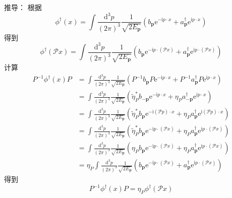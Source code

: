 推导：
根据
\begin{equation}
    \phi ^{\dagger}(x)=\int{\frac{\mathrm{d}^3p}{\left( 2\pi \right) ^3}}\frac{1}{\sqrt{2E_{\mathbf{p}}}}\left( b_{\mathbf{p}}\mathrm{e}^{-\mathrm{i}p\cdot x}+a_{\mathbf{p}}^{\dagger}\mathrm{e}^{\mathrm{i}p\cdot x} \right) 
\end{equation}
得到
\begin{equation}
    \phi ^{\dagger}(\mathcal{P} x)=\int{\frac{\mathrm{d}^3p}{\left( 2\pi \right) ^3}}\frac{1}{\sqrt{2E_{\mathbf{p}}}}\left( b_{\mathbf{p}}\mathrm{e}^{-\mathrm{i}p\cdot \left( \mathcal{P} x \right)}+a_{\mathbf{p}}^{\dagger}\mathrm{e}^{\mathrm{i}p\cdot \left( \mathcal{P} x \right)} \right) 
\end{equation}
计算
\begin{equation}
    \begin{aligned}
        P^{-1}\phi ^{\dagger}(x)P&=\int{\frac{\mathrm{d}^3p}{\left( 2\pi \right) ^3}}\frac{1}{\sqrt{2E_{\mathbf{p}}}}\left( P^{-1}b_{\mathbf{p}}P\mathrm{e}^{-\mathrm{i}p\cdot x}+P^{-1}a_{\mathbf{p}}^{\dagger}P\mathrm{e}^{\mathrm{i}p\cdot x} \right) 
\\
&=\int{\frac{\mathrm{d}^3p}{\left( 2\pi \right) ^3}}\frac{1}{\sqrt{2E_{\mathbf{p}}}}\left( \tilde{\eta}_{P}^{*}b_{-\mathbf{p}}\mathrm{e}^{-\mathrm{i}p\cdot x}+\eta _Pa_{-\mathbf{p}}^{\dagger}\mathrm{e}^{\mathrm{i}p\cdot x} \right) 
\\
&=\int{\frac{\mathrm{d}^3p}{\left( 2\pi \right) ^3}}\frac{1}{\sqrt{2E_{\mathbf{p}}}}\left( \tilde{\eta}_{P}^{*}b_{\mathbf{p}}\mathrm{e}^{-\mathrm{i}\left( \mathcal{P} p \right) \cdot x}+\eta _Pa_{\mathbf{p}}^{\dagger}\mathrm{e}^{\mathrm{i}\left( \mathcal{P} p \right) \cdot x} \right) 
\\
&=\int{\frac{\mathrm{d}^3p}{\left( 2\pi \right) ^3}}\frac{1}{\sqrt{2E_{\mathbf{p}}}}\left( \tilde{\eta}_{P}^{*}b_{\mathbf{p}}\mathrm{e}^{-\mathrm{i}p\cdot \left( \mathcal{P} x \right)}+\eta _Pa_{\mathbf{p}}^{\dagger}\mathrm{e}^{\mathrm{i}p\cdot \left( \mathcal{P} x \right)} \right) 
\\
&=\int{\frac{\mathrm{d}^3p}{\left( 2\pi \right) ^3}}\frac{1}{\sqrt{2E_{\mathbf{p}}}}\left( \eta _Pb_{\mathbf{p}}\mathrm{e}^{-\mathrm{i}p\cdot \left( \mathcal{P} x \right)}+\eta _Pa_{\mathbf{p}}^{\dagger}\mathrm{e}^{\mathrm{i}p\cdot \left( \mathcal{P} x \right)} \right) 
\\
&=\eta _P\int{\frac{\mathrm{d}^3p}{\left( 2\pi \right) ^3}}\frac{1}{\sqrt{2E_{\mathbf{p}}}}\left( b_{\mathbf{p}}\mathrm{e}^{-\mathrm{i}p\cdot \left( \mathcal{P} x \right)}+a_{\mathbf{p}}^{\dagger}\mathrm{e}^{\mathrm{i}p\cdot \left( \mathcal{P} x \right)} \right) 
    \end{aligned}
\end{equation}
得到
\begin{equation}
    P^{-1}\phi ^{\dagger}(x)P=\eta _P\phi ^{\dagger}(\mathcal{P} x)
\end{equation}



